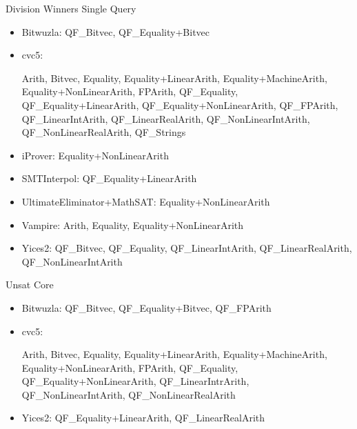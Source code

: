 \documentclass[table]{beamer}
\def\emph#1{\textcolor{MYblue}{#1}}
\begin{document}
\begin{frame}{Division Winners}
  \pause
  \emph{Single Query}
  \begin{itemize}
  \item \emph{Bitwuzla}: {\small QF\_Bitvec, QF\_Equality+Bitvec}
  \item \emph{cvc5}: \begin{minipage}{.8\textwidth}\raggedright \tiny Arith, Bitvec, Equality, Equality+LinearArith, Equality+MachineArith, Equality+NonLinearArith, FPArith, QF\_Equality, QF\_Equality+LinearArith, QF\_Equality+NonLinearArith, QF\_FPArith, QF\_LinearIntArith, QF\_LinearRealArith, QF\_NonLinearIntArith, QF\_NonLinearRealArith, QF\_Strings\end{minipage}
  \item \emph{iProver}: {\small Equality+NonLinearArith}
  \item \emph{SMTInterpol}: {\small QF\_Equality+LinearArith}
  \item \emph{UltimateEliminator+MathSAT}: {\small Equality+NonLinearArith}
  \item \emph{Vampire}: {\small Arith, Equality, Equality+NonLinearArith}
  \item \emph{Yices2}: {\tiny QF\_Bitvec, QF\_Equality, QF\_LinearIntArith, QF\_LinearRealArith, QF\_NonLinearIntArith}
  \end{itemize}

  \medskip

  \pause
  \emph{Unsat Core}
  \begin{itemize}
  \item \emph{Bitwuzla}: {\small QF\_Bitvec, QF\_Equality+Bitvec, QF\_FPArith}
  \item \emph{cvc5}: \begin{minipage}{.8\textwidth}\raggedright \tiny Arith, Bitvec, Equality, Equality+LinearArith, Equality+MachineArith, Equality+NonLinearArith, FPArith, QF\_Equality, QF\_Equality+NonLinearArith, QF\_LinearIntrArith, QF\_NonLinearIntArith, QF\_NonLinearRealArith \end{minipage}
  \item \emph{Yices2}: {\small QF\_Equality+LinearArith, QF\_LinearRealArith}
  \end{itemize}

\end{frame}
\end{document}

